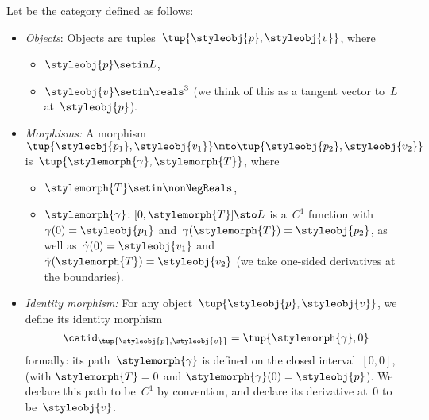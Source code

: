 \begin{definition}[\Berg]
    \label{def:Berg}
    Let \Berg be the category defined as follows:
    \begin{itemize}
        \item \emph{Objects}: Objects are tuples~$\tup{\styleobj{p},\styleobj{v}}$, where
              \begin{itemize}
                  \item $\styleobj{p} \setin L$,
                  \item $\styleobj{v} \setin \reals^3$ (we think of this as a tangent vector to~$L$ at~$\styleobj{p}$).
              \end{itemize}

        \item \emph{Morphisms:}
              A morphism~$\tup{\styleobj{p_1}, \styleobj{v_1}} \mto \tup{\styleobj{p_2}, \styleobj{v_2}}$ is~$\tup{\stylemorph{\gamma}, \stylemorph{T}}$,
              where
              \begin{itemize}
                  \item $\stylemorph{T} \setin \nonNegReals$,
                  \item $\stylemorph{\gamma} \colon [0, \stylemorph{T}] \sto L$ is a~$C^1$ function with~$\gamma(0)=\styleobj{p_1}$ and~$\gamma(\stylemorph{T})=\styleobj{p_2}$, as well as~$\dot \gamma(0) = \styleobj{v_1}$ and~$\dot \gamma(\stylemorph{T}) = \styleobj{v_2}$  (we take one-sided derivatives at the boundaries).
              \end{itemize}
        \item \emph{Identity morphism:}
              For any object~$\tup{\styleobj{p}, \styleobj{v}}$, we define its identity morphism
              \begin{equation}
                  \catid_{\tup{\styleobj{p},\styleobj{v}}} = \tup{\stylemorph{\gamma}, 0}
              \end{equation}
              formally: its path~$\stylemorph{\gamma}$ is defined on the closed interval~$[0,0]$, (with $\stylemorph{T}=0$ and $\stylemorph{\gamma}(0) = \styleobj{p}$).
              We declare this path to be~$C^1$ by convention, and declare its derivative at~$0$ to be~$\styleobj{v}$.


\end{itemize}
\end{definition}
